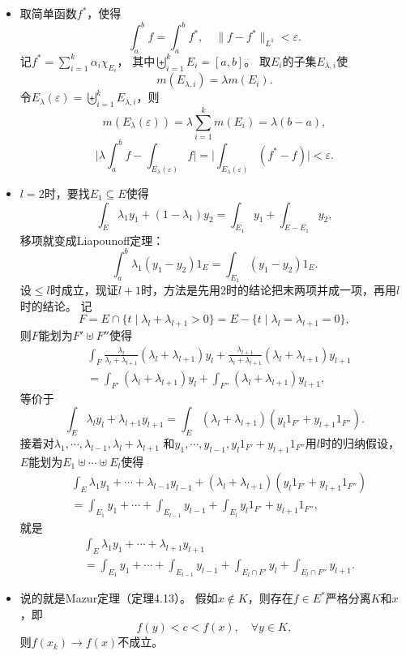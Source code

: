 \begin{itemize}
    \item[15.] 取简单函数$f^*$，使得
    \[\int_a^bf=\int_a^bf^*,\quad\|f-f^*\|_{L^1}<\varepsilon.\]
    记$f^*=\sum\limits_{i=1}^k\alpha_i\chi_{E_i}$，
    其中$\biguplus\limits_{i=1}^kE_i=[a,b]$。
    取$E_i$的子集$E_{\lambda,i}$使
    \[m(E_{\lambda,i})=\lambda m(E_i).\]
    令$E_{\lambda}(\varepsilon)=\biguplus\limits_{i=1}^kE_{\lambda,i}$，则
    \[m(E_{\lambda}(\varepsilon))=\lambda\sum_{i=1}^km(E_i)=\lambda(b-a),\]
    \[\bigg|\lambda\int_a^bf-\int_{E_\lambda(\varepsilon)}f\bigg|
    =\bigg|\int_{E_\lambda(\varepsilon)}(f^*-f)\bigg|<\varepsilon.\]

    \item[19.] $l=2$时，要找$E_1\subseteq E$使得
    \[\int_E\lambda_1y_1+(1-\lambda_1)y_2=\int_{E_1}y_1+\int_{E-E_1}y_2,\]
    移项就变成Liapounoff定理：
    \[\int_a^b\lambda_1(y_1-y_2)1_E=\int_{E_1}(y_1-y_2)1_E.\]
    设$\le l$时成立，现证$l+1$时，方法是先用$2$时的结论把末两项并成一项，再用$l$时的结论。
    记\[F=E\cap\{t\mid\lambda_l+\lambda_{l+1}>0\}
    =E-\{t\mid\lambda_l=\lambda_{l+1}=0\},\]
    则$F$能划为$F'\uplus F''$使得
    \begin{align*}
        &\int_{F}\frac{\lambda_l}{\lambda_l+\lambda_{l+1}}(\lambda_l+\lambda_{l+1})y_l
        +\frac{\lambda_{l+1}}{\lambda_l+\lambda_{l+1}}(\lambda_l+\lambda_{l+1})y_{l+1}\\
        &=\int_{F'}(\lambda_l+\lambda_{l+1})y_l
        +\int_{F''}(\lambda_l+\lambda_{l+1})y_{l+1},
    \end{align*}
    等价于
    \[\int_{E}\lambda_ly_l+\lambda_{l+1}y_{l+1}
    =\int_{E}(\lambda_l+\lambda_{l+1})(y_l1_{F'}+y_{l+1}1_{F''}).\]
    接着对$\lambda_1,\cdots,\lambda_{l-1},\lambda_l+\lambda_{l+1}$
    和$y_1,\cdots,y_{l-1},y_l1_{F'}+y_{l+1}1_{F''}$用$l$时的归纳假设，
    $E$能划为$E_1\uplus\cdots\uplus E_l$使得
    \begin{align*}
        &\int_E\lambda_1y_1+\cdots+\lambda_{l-1}y_{l-1}
        +(\lambda_l+\lambda_{l+1})(y_l1_{F'}+y_{l+1}1_{F''})\\
        &=\int_{E_1}y_1+\cdots+\int_{E_{l-1}}y_{l-1}
        +\int_{E_l}y_l1_{F'}+y_{l+1}1_{F''},
    \end{align*}
    就是
    \begin{align*}
        &\int_E\lambda_1y_1+\cdots+\lambda_{l+1}y_{l+1}\\
        &=\int_{E_1}y_1+\cdots+\int_{E_{l-1}}y_{l-1}
        +\int_{E_l\cap F'}y_l+\int_{E_l\cap F''}y_{l+1}.
    \end{align*}

    \item[29.] 说的就是Mazur定理（定理4.13）。
    假如$x\notin K$，则存在$f\in E^*$严格分离$K$和$x$，即
    \[f(y)<c<f(x),\quad\forall y\in K,\]
    则$f(x_k)\to f(x)$不成立。
\end{itemize}

